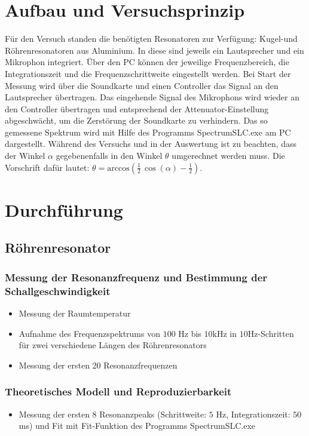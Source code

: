 \documentclass[german,  %
parskip=full,  %
]{scrartcl}
\begin{document}
\section{Aufbau und Versuchsprinzip}
Für den Versuch standen die benötigten Resonatoren zur Verfügung: Kugel-und Röhrenresonatoren aus Aluminium. In diese sind jeweils ein Lautsprecher und ein Mikrophon integriert. Über den PC können der jeweilige Frequenzbereich, die Integrationszeit und die Frequenzschrittweite eingestellt werden. Bei Start der Messung wird über die Soundkarte und einen Controller das Signal an den Lautsprecher übertragen. Das eingehende Signal des Mikrophons wird wieder an den Controller übertragen und entsprechend der Attenuator-Einstellung abgeschwächt, um die Zerstörung der Soundkarte zu verhindern. Das so gemessene Spektrum wird mit Hilfe des Programms SpectrumSLC.exe am PC dargestellt. 
\newline Während des Versuchs und in der Auswertung ist zu beachten, dass der Winkel $\alpha$ gegebenenfalls in den Winkel $\theta$ umgerechnet werden muss. Die Vorschrift dafür lautet: $\theta = \text{arccos}\left(\frac{1}{2}\,\cos(\alpha)-\frac{1}{2}\right)$.


\section{Durchführung}
\subsection{Röhrenresonator}
\subsubsection{Messung der Resonanzfrequenz und Bestimmung der Schallgeschwindigkeit}
\begin{itemize}
\item Messung der Raumtemperatur
\item Aufnahme des Frequenzspektrums von $100$ Hz bis $10$kHz in $10$Hz-Schritten für zwei verschiedene Längen des Röhrenresonators 
\item Messung der ersten 20 Resonanzfrequenzen
\end{itemize}
\subsubsection{Theoretisches Modell und Reproduzierbarkeit}
\begin{itemize}
\item Messung der ersten 8 Resonanzpeaks (Schrittweite: $5$ Hz, Integrationszeit: $50$ms) und Fit mit Fit-Funktion des Programms SpectrumSLC.exe
\end{itemize}
\end{document}
